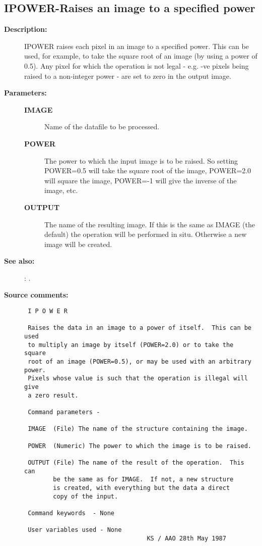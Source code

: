 \subsection{IPOWER-\label{IPOWER}Raises an image to a specified power}
\begin{description}

\item [{\bf Description:}]
 IPOWER raises each pixel in an image to a specified power.  This
 can be used, for example, to take the square root of an image (by
 using a power of 0.5).  Any pixel for which the operation is not
 legal - e.g. -ve pixels being raised to a non-integer power - are
 set to zero in the output image.

\item [{\bf Parameters:}]
\begin{description}
\item [{\bf IMAGE}]
 Name of the datafile to be processed.
\item [{\bf POWER}]
 The power to which the input image is to be
 raised.  So setting POWER=0.5 will take the square root
 of the image, POWER=2.0 will square the image, POWER=-1
 will give the inverse of the image, etc.
\item [{\bf OUTPUT}]
 The name of the resulting image.  If this is the
 same as IMAGE (the default) the operation will be
 performed in situ.  Otherwise a new image will be
 created.
\end{description}

\item [{\bf See also:}]
: .\\

\item [{\bf Source comments:}]
\begin{verbatim}
 I P O W E R

 Raises the data in an image to a power of itself.  This can be used
 to multiply an image by itself (POWER=2.0) or to take the square
 root of an image (POWER=0.5), or may be used with an arbitrary power.
 Pixels whose value is such that the operation is illegal will give
 a zero result.

 Command parameters -

 IMAGE  (File) The name of the structure containing the image.

 POWER  (Numeric) The power to which the image is to be raised.

 OUTPUT (File) The name of the result of the operation.  This can
        be the same as for IMAGE.  If not, a new structure
        is created, with everything but the data a direct
        copy of the input.

 Command keywords  - None

 User variables used - None
                                  KS / AAO 28th May 1987
\end{verbatim}
\end{description}
